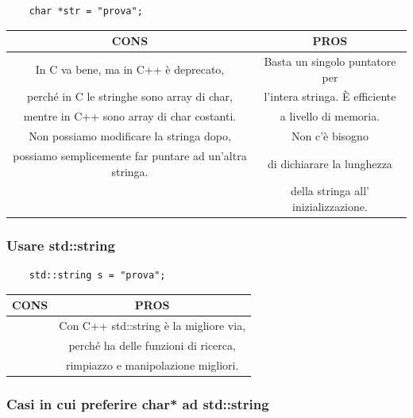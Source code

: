 \begin{lstlisting}
	char *str = "prova";
\end{lstlisting}

\begin{tabular}{|c|c|}
	\hline
	\color{red} CONS & \color{Green} PROS \\
	\hline
	\textsf{\small In C va bene, ma in C++ è deprecato,  } & \textsf{\small Basta un singolo puntatore per  } \\
	\textsf{\small perché in C le stringhe sono array di char,} & \textsf{\small l'intera stringa. È efficiente } \\
	\textsf{\small mentre in C++ sono array di char costanti.} & \textsf{\small a livello di memoria.} \\
	\hline
	\textsf{\small Non possiamo modificare la stringa dopo, } & \textsf{\small Non c'è bisogno  } \\
	\textsf{\small possiamo semplicemente far puntare ad un'altra stringa.} & \textsf{\small di dichiarare la lunghezza } \\
	\textsf{\small } & \textsf{\small della stringa all' inizializzazione.} \\
	\hline
\end{tabular}

\subsubsection{Usare std::string}

\begin{lstlisting}
	std::string s = "prova";
\end{lstlisting}

\begin{tabular}{|c|c|}
	\hline
	\color{red} CONS & \color{Green} PROS \\
	\hline
	\textsf{\small } & \textsf{\small Con C++ std::string è la migliore via,  } \\
	\textsf{\small } & \textsf{\small perché ha delle funzioni di ricerca,} \\
	\textsf{\small } & \textsf{\small rimpiazzo e manipolazione migliori.} \\
	\hline
\end{tabular}

\subsubsection{Casi in cui preferire char* ad std::string}


